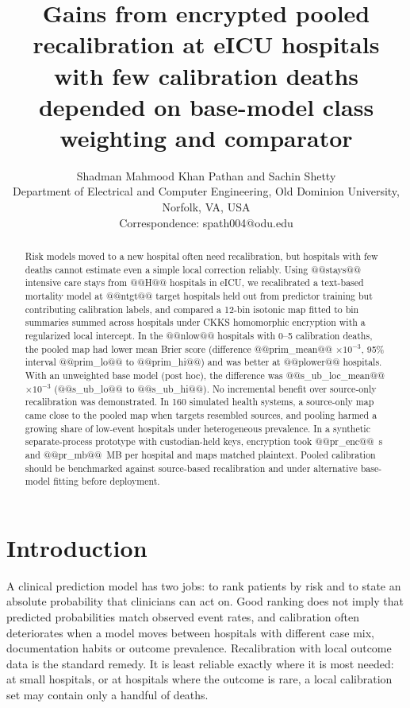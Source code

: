 \documentclass[11pt]{article}
\title{Gains from encrypted pooled recalibration at eICU hospitals with few calibration deaths depended on base-model class weighting and comparator}
\author{Shadman Mahmood Khan Pathan and Sachin Shetty\\
Department of Electrical and Computer Engineering, Old Dominion University, Norfolk, VA, USA\\
Correspondence: spath004@odu.edu}
\date{}
\begin{document}
\maketitle
\begin{abstract}
\noindent Risk models moved to a new hospital often need recalibration, but hospitals with few deaths cannot estimate even a simple local correction reliably. Using @@stays@@ intensive care stays from @@H@@ hospitals in eICU, we recalibrated a text-based mortality model at @@ntgt@@ target hospitals held out from predictor training but contributing calibration labels, and compared a 12-bin isotonic map fitted to bin summaries summed across hospitals under CKKS homomorphic encryption with a regularized local intercept. In the @@nlow@@ hospitals with 0--5 calibration deaths, the pooled map had lower mean Brier score (difference @@prim_mean@@ $\times10^{-3}$, 95\% interval @@prim_lo@@ to @@prim_hi@@) and was better at @@plower@@ hospitals. With an unweighted base model (post hoc), the difference was @@s_ub_loc_mean@@ $\times10^{-3}$ (@@s_ub_lo@@ to @@s_ub_hi@@). No incremental benefit over source-only recalibration was demonstrated. In 160 simulated health systems, a source-only map came close to the pooled map when targets resembled sources, and pooling harmed a growing share of low-event hospitals under heterogeneous prevalence. In a synthetic separate-process prototype with custodian-held keys, encryption took @@pr_enc@@~s and @@pr_mb@@~MB per hospital and maps matched plaintext. Pooled calibration should be benchmarked against source-based recalibration and under alternative base-model fitting before deployment.
\end{abstract}

\section*{Introduction}
A clinical prediction model has two jobs: to rank patients by risk and to state an absolute probability that clinicians can act on. Good ranking does not imply that predicted probabilities match observed event rates, and calibration often deteriorates when a model moves between hospitals with different case mix, documentation habits or outcome prevalence\cite{r3,vancalster2019,finlayson2021}. Recalibration with local outcome data is the standard remedy\cite{r17,janssen2008}. It is least reliable exactly where it is most needed: at small hospitals, or at hospitals where the outcome is rare, a local calibration set may contain only a handful of deaths.
\end{document}
